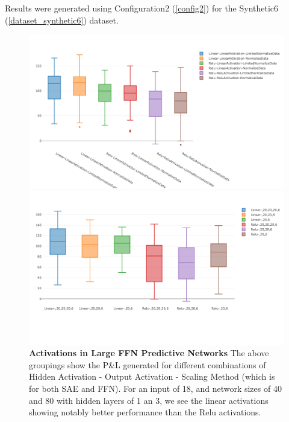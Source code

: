 \documentclass[a4paper,latin]{paper}
\begin{document}
Results were generated using Configuration2 (\ref{config2}) for the Synthetic6 (\ref{dataset_synthetic6}) dataset. 


\begin{figure}[H]
	\centering
	\begin{minipage}{0.45\textwidth}
	\centering \includegraphics[scale=0.2]{images/iteration_two/linear-ffn/Scaling_Methodolgy_Profits.png}
	\caption{\textbf{Activations in Large FFN Predictive Networks}
		\newline The above groupings show the P\&L generated for different combinations of Hidden Activation - Output Activation - Scaling Method (which is for both SAE and FFN). For an input of 18, and network sizes of 40 and 80 with hidden layers of 1 an 3, we see the linear activations showing notably better performance than the Relu activations.
	}	
	\label{figure-results-linear-ffn_activations}
	\end{minipage}\hfill
	\begin{minipage}{0.45\textwidth}
	\centering \includegraphics[scale=0.2]{images/iteration_three/it3_linear_vs_relu.png}

\end{minipage}
\end{figure}
\end{document}
